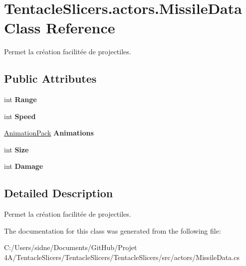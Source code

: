 \hypertarget{class_tentacle_slicers_1_1actors_1_1_missile_data}{}\section{Tentacle\+Slicers.\+actors.\+Missile\+Data Class Reference}
\label{class_tentacle_slicers_1_1actors_1_1_missile_data}


Permet la création facilitée de projectiles.  


\subsection*{Public Attributes}
\begin{DoxyCompactItemize}
\item 
\mbox{\label{class_tentacle_slicers_1_1actors_1_1_missile_data_aa7f3e1945d1d57f9ca4c1b39b435c539}} 
int {\bfseries Range}
\item 
\mbox{\label{class_tentacle_slicers_1_1actors_1_1_missile_data_a204b57c4699d596d5e4b053aaadf7a03}} 
int {\bfseries Speed}
\item 
\mbox{\label{class_tentacle_slicers_1_1actors_1_1_missile_data_a5d5ff4f73aad58336033c0dee6030da3}} 
\hyperlink{class_tentacle_slicers_1_1graphics_1_1_animation_pack}{Animation\+Pack} {\bfseries Animations}
\item 
\mbox{\label{class_tentacle_slicers_1_1actors_1_1_missile_data_a251a7f9e6358e54c59f8203aace91001}} 
int {\bfseries Size}
\item 
\mbox{\label{class_tentacle_slicers_1_1actors_1_1_missile_data_ac2c98917a0c7145fbc86835ec2e843fd}} 
int {\bfseries Damage}
\end{DoxyCompactItemize}


\subsection{Detailed Description}
Permet la création facilitée de projectiles. 



The documentation for this class was generated from the following file\+:\begin{DoxyCompactItemize}
\item 
C\+:/\+Users/sidne/\+Documents/\+Git\+Hub/\+Projet 4\+A/\+Tentacle\+Slicers/\+Tentacle\+Slicers/\+Tentacle\+Slicers/src/actors/Missile\+Data.\+cs\end{DoxyCompactItemize}

